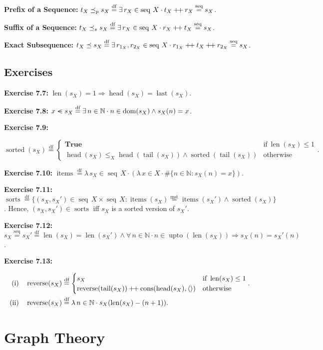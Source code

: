 \documentclass[12pt]{article}
\newcommand{\dfeq}{\stackrel{\text{df}}{=}}
\newcommand{\msteq}{\stackrel{\text{mst}}{=}}
\newcommand{\seqeq}{\stackrel{\text{seq}}{=}}
\newcommand{\seqin}{%
  \mathrel{\vphantom{<}\text{%
    \mathsurround=0pt
    \ooalign{$<$\cr$-$\cr}%
  }}%
}
\newcommand{\pp}{\mathbin{\mbox{{+}\nolinebreak\hspace{-.15em}{+}}}}
\DeclareMathOperator{\jtrue}{\mathbf{True}}
\DeclareMathOperator{\jseq}{seq}
\DeclareMathOperator{\jreverse}{reverse}
\DeclareMathOperator{\jdom}{dom}
\DeclareMathOperator{\jitems}{items}
\DeclareMathOperator{\jsorted}{sorted}
\DeclareMathOperator{\jupto}{upto}
\DeclareMathOperator{\jcons}{cons}
\DeclareMathOperator{\jhead}{head}
\DeclareMathOperator{\jlast}{last}
\DeclareMathOperator{\jtail}{tail}
\DeclareMathOperator{\jlen}{len}
\theoremstyle{plain}
\begin{document}
\textbf{Prefix of a Sequence:} $t_X \preceq_{p} s_X \dfeq \exists\,
r_X \in \jseq\, X \cdot t_X \pp r_X \seqeq s_X$.

\textbf{Suffix of a Sequence:} $t_X \preceq_{s} s_X \dfeq \exists\,
r_X \in \jseq\, X \cdot r_X \pp t_X \seqeq s_X$.

\textbf{Exact Subsequence:} $t_X \preceq s_X \dfeq \exists\,
r_{1_X}, r_{2_X} \in \jseq\, X \cdot r_{1_X} \pp t_X \pp r_{2_X}
\seqeq s_X$.

\subsection{Exercises}

\textbf{Exercise 7.7:} $\jlen(s_X) = 1 \Rightarrow \jhead(s_X) =
\jlast(s_X)$.

\textbf{Exercise 7.8:} $x \seqin s_X \dfeq \exists\, n \in
\mathbb{N} \cdot n \in \jdom(s_X) \land s_X(n) = x$.

\textbf{Exercise 7.9:}

$$
\jsorted(s_X) \dfeq
\begin{cases}
    \jtrue & \text{if}\ \jlen(s_X) \leq  1\\
    \jhead(s_X) \leq_{X} \jhead(\jtail(s_X)) \land
    \jsorted(\jtail(s_X)) & \text{otherwise}
\end{cases}.
$$

\textbf{Exercise 7.10:} $\jitems \dfeq \lambda\, s_X \in \jseq\,
X \cdot (\lambda\, x \in X \cdot \#\{n \in \mathbb{N} : s_X(n) =
x\})$.

\textbf{Exercise 7.11:} $\operatorname{sorts} \dfeq \{(s_X,
s_X') \in \jseq\, X \times \jseq\, X : \jitems(s_X) \msteq
\jitems(s_X') \land \jsorted(s_X) \}$. Hence, $(s_X, s_X') \in
\operatorname{sorts}$ iff $s_X$ is a sorted version of $s_X'$.

\textbf{Exercise 7.12:} $s_X \seqeq s_X' \dfeq \jlen(s_X) =
\jlen(s_X') \land \forall\, n \in \mathbb{N} \cdot n \in
\jupto(\jlen(s_X)) \Rightarrow s_X(n) = s_X'(n)$. 

\textbf{Exercise 7.13:}

$$
\begin{aligned}
\text{(i)}\quad &
\jreverse(s_X) \dfeq
\begin{cases}
    s_X & \text{if}\ \jlen(s_X) \leq 1\\
    \jreverse(\jtail(s_X)) \pp \jcons(\jhead(s_X), \langle
    \rangle) & \text{otherwise}
\end{cases}.\\
\text{(ii)}\quad &
\jreverse(s_X) \dfeq \lambda\, n \in \mathbb{N} \cdot
s_X(\jlen(s_X) - (n + 1)).
\end{aligned}
$$

\section{Graph Theory}
\end{document}
